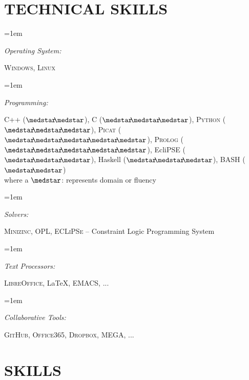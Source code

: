 \documentclass[paper=a4,fontsize=11pt]{scrartcl} %
\newlength{\spacebox}
\newcommand{\NewPart}[1]{\section*{\uppercase{#1}}}
\newcommand{\PersonalEntry}[2]{
		\noindent\hangindent=2em\hangafter=0 %
		\parbox{\spacebox}{        %
		\textit{#1}}		       %
		\hspace{1.5em} #2 \par}    %
\newcommand{\SkillsEntry}[2]{      %
		\noindent\hangindent=1em\hangafter=0 %
		\parbox{\spacebox}{        %
		\textit{#1}}			   %
		\hspace{1.2em} #2 \par}    %
\begin{document}
\NewPart{Technical Skills}{}

\SkillsEntry{Operating System:} {\textsc{Windows}, \textsc{Linux}}

\SkillsEntry{Programming:} {\textsc{C++} ($\medstar\hspace{-1mm}\medstar$), \textsc{C} ($\medstar\hspace{-1mm}\medstar\hspace{-1mm}\medstar$), \textsc{Python} ($\medstar\hspace{-1mm}\medstar\hspace{-1mm}\medstar$), \textsc{Picat} ($\medstar\hspace{-1mm}\medstar\hspace{-1mm}\medstar\hspace{-1mm}\medstar\hspace{-1mm}\medstar$),  \textsc{Prolog} 
($\medstar\hspace{-1mm}\medstar\hspace{-1mm}\medstar\hspace{-1mm}\medstar\hspace{-1mm}\medstar$), EcliPSE
($\medstar\hspace{-1mm}\medstar\hspace{-1mm}\medstar$), Haskell 
($\medstar\hspace{-1mm}\medstar\hspace{-1mm}\medstar$), BASH ($\medstar\hspace{-1mm}\medstar$) \\ where a $\medstar$: represents domain or fluency}

\SkillsEntry{Solvers:} {\textsc{Minizinc}, \textsc{OPL}, \textsc{ECLiPSe} -- Constraint Logic Programming System }

\SkillsEntry{Text Processors:} {\textsc{LibreOffice}, \LaTeX, \textsc{EMACS}, ...}

\SkillsEntry{Collaborative Tools:}  {\textsc{GitHub}, \textsc{Office365}, \textsc{Dropbox}, \textsc{MEGA}, ...}


\NewPart{Skills}{}
\end{document}

